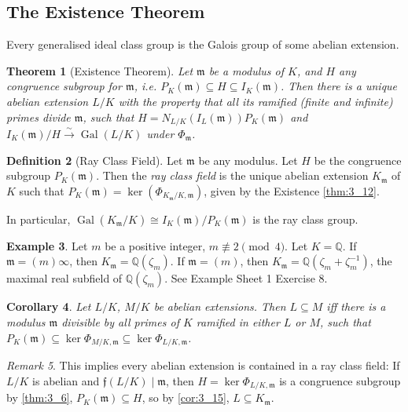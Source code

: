 \documentclass[11pt]{article}
\theoremstyle{definition}
\newtheorem{definition}{Definition}[section]
\newtheorem{example}[definition]{Example}
\theoremstyle{plain}
\newtheorem{theorem}[definition]{Theorem}
\newtheorem{corollary}[definition]{Corollary}
\theoremstyle{remark}
\newtheorem{remark}[definition]{Remark}
\DeclareMathOperator{\Gal}{Gal}
\newcommand{\QQ}{\mathbb{Q}}
\newcommand{\ff}{\mathfrak{f}}
\newcommand{\fm}{\mathfrak{m}}
\begin{document}
\subsection{The Existence Theorem}

Every generalised ideal class group is the Galois group of some abelian extension.

\begin{theorem}[Existence Theorem]\label{thm:3_12}
    Let $\fm$ be a modulus of $K$, and $H$ any congruence subgroup for $\fm$, i.e. $P_K(\fm) \subseteq H \subseteq I_K(\fm)$. Then there is a unique abelian extension $L/K$ with the property that all its ramified (finite and infinite) primes divide $\fm$, such that $H = N_{L/K}(I_L(\fm)) P_K(\fm)$ and $I_K(\fm) / H \xrightarrow{\sim} \Gal(L/K)$ under $\Phi_\fm$.
\end{theorem}

\begin{definition}[Ray Class Field]\label{def:3_13}
    Let $\fm$ be any modulus. Let $H$ be the congruence subgroup $P_K(\fm)$. Then the \emph{ray class field} is the unique abelian extension $K_\fm$ of $K$ such that $P_K(\fm) = \ker(\Phi_{K_\fm / K, \fm})$, given by the Existence \autoref{thm:3_12}.

    In particular, $\Gal(K_\fm / K) \cong I_K(\fm)/P_K(\fm)$ is the ray class group.
\end{definition}

\begin{example}\label{eg:3_14}
    Let $m$ be a positive integer, $m \not\equiv 2 \pmod{4}$. Let $K = \QQ$. If $\fm = (m) \infty$, then $K_\fm = \QQ(\zeta_m)$. If $\fm = (m)$, then $K_\fm = \QQ(\zeta_m + \zeta_m^{-1})$, the maximal real subfield of $\QQ(\zeta_m)$. See Example Sheet 1 Exercise 8.
\end{example}

\begin{corollary}\label{cor:3_15}
    Let $L/K$, $M/K$ be abelian extensions. Then $L \subseteq M$ iff there is a modulus $\fm$ divisible by all primes of $K$ ramified in either $L$ or $M$, such that $P_K(\fm) \subseteq \ker \Phi_{M/K, \fm} \subseteq \ker \Phi_{L/K, \fm}$.
\end{corollary}

\begin{remark}\label{rem:3_16}
    This implies every abelian extension is contained in a ray class field: If $L/K$ is abelian and $\ff(L/K) \mid \fm$, then $H = \ker \Phi_{L/K, \fm}$ is a congruence subgroup by \autoref{thm:3_6}, $P_K(\fm) \subseteq H$, so by \autoref{cor:3_15}, $L \subseteq K_\fm$.
\end{remark}
\end{document}
